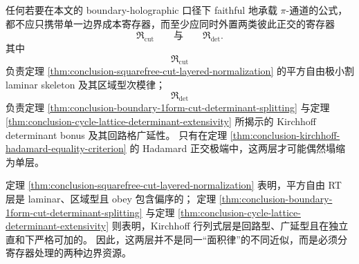 \begin{conjecture}\label{conj:conclusion-faithful-pi-formula-cut-determinant-two-register}
任何若要在本文的 boundary-holographic 口径下 faithful 地承载 \(\pi\)-通道的公式，都不应只携带单一边界成本寄存器，而至少应同时外置两类彼此正交的寄存器
\[
\mathfrak R_{\mathrm{cut}}
\qquad\text{与}\qquad
\mathfrak R_{\mathrm{det}}.
\]
其中
\[
\mathfrak R_{\mathrm{cut}}
\]
负责定理 \ref{thm:conclusion-squarefree-cut-layered-normalization} 的平方自由极小割 laminar skeleton 及其区域型次模律；
\[
\mathfrak R_{\mathrm{det}}
\]
负责定理 \ref{thm:conclusion-boundary-1form-cut-determinant-splitting} 与定理 \ref{thm:conclusion-cycle-lattice-determinant-extensivity} 所揭示的 Kirchhoff determinant bonus 及其回路格广延性。
只有在定理 \ref{thm:conclusion-kirchhoff-hadamard-equality-criterion} 的 Hadamard 正交极端中，这两层才可能偶然塌缩为单层。
\end{conjecture}

\begin{remark}[统一读法]\label{rem:conclusion-squarefree-cut-kirchhoff-loop-double-register}
定理 \ref{thm:conclusion-squarefree-cut-layered-normalization} 表明，平方自由 RT 层是 laminar、区域型且 obey 包含偏序的；
定理 \ref{thm:conclusion-boundary-1form-cut-determinant-splitting} 与定理 \ref{thm:conclusion-cycle-lattice-determinant-extensivity} 则表明，Kirchhoff 行列式层是回路型、广延型且在独立直和下严格可加的。
因此，这两层并不是同一“面积律”的不同近似，而是必须分寄存器处理的两种边界资源。
\end{remark}

\endinput
